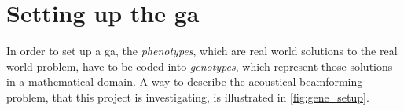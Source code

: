 \section{Setting up the \gls{ga}}
In order to set up a \gls{ga}, the \textit{phenotypes}, which are real world solutions to the real world problem, have to be coded into \textit{genotypes}, which represent those solutions in a mathematical domain.
A way to describe the acoustical beamforming problem, that this project is investigating, is illustrated in \autoref{fig:gene_setup}.


